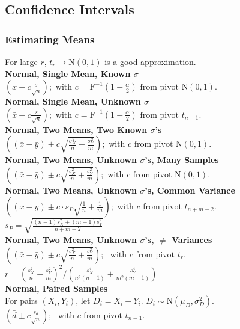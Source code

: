 \documentclass{article}
\begin{document}
\begin{multicols*}{2}
\subsection*{Confidence Intervals}
{\color{magenta}\subsubsection*{Estimating Means}}
{\color{blue}For large $r$, $t_{r} \longrightarrow \mbox{N}(0, 1)$ is a good approximation.}\\
\textbf{Normal, Single Mean, Known $\sigma$}\\
$ \left( \bar{x} \pm c \frac{\sigma}{\sqrt{n}} \right) ; \mbox{ with } c=\mbox{F}^{-1}(1-\frac{\alpha}{2}) \mbox{ from pivot } \mbox{N}(0, 1).$\\
\textbf{Normal, Single Mean, Unknown $\sigma$}\\
$ \left( \bar{x} \pm c \frac{s}{\sqrt{n}} \right); \mbox{ with } c=\mbox{F}^{-1}(1-\frac{\alpha}{2}) \mbox{ from pivot } t_{n-1}.$\\
\textbf{Normal, Two Means, Two Known $\sigma$'s}\\
$ \left( (\bar{x} - \bar{y}) \pm c \sqrt{\frac{\sigma_{X}^{2}}{n} + \frac{\sigma_{Y}^{2}}{m}} \right); \mbox{ with } c \mbox{ from pivot } \mbox{N}(0, 1).$\\
\textbf{Normal, Two Means, Unknown $\sigma$'s, Many Samples}\\
$ \left( (\bar{x} - \bar{y}) \pm c \sqrt{\frac{s_{X}^{2}}{n} + \frac{s_{Y}^{2}}{m}} \right); \mbox{ with } c \mbox{ from pivot } \mbox{N}(0, 1).$\\
\textbf{Normal, Two Means, Unknown $\sigma$'s, Common Variance}\\
$ \left( (\bar{x} - \bar{y}) \pm c \cdot s_{P} \sqrt{\frac{1}{n} + \frac{1}{m}} \right); \mbox{ with } c \mbox{ from pivot } t_{n+m-2}.$\\
\-\hspace{2cm} $ s_{P} = \sqrt{\frac{(n-1) s^{2}_{X} + (m-1) s^{2}_{Y}}{n+m-2}} $\\
\textbf{Normal, Two Means, Unknown $\sigma$'s, $\neq$ Variances}\\  %
$ \left( (\bar{x} - \bar{y}) \pm c \sqrt{\frac{s_{X}^{2}}{n} + \frac{s_{Y}^{2}}{m}} \right);$ {\color{blue}$\mbox{ with } c \mbox{ from pivot } t_{r}.$}\\
\-\hspace{1cm} $ r = \left( \frac{s_{X}^{2}}{n} + \frac{s_{Y}^{2}}{m} \right)^2 / \left( \frac{s_{X}^{4}}{n^{2}(n-1)} + \frac{s_{Y}^{4}}{m^{2}(m-1)} \right) $\\
\textbf{Normal, Paired Samples}\\
For pairs $(X_{i}, Y_{i})$, let $D_{i} = X_{i} - Y_{i}$. $D_{i} \sim \mbox{N}(\mu_{D}, \sigma_{D}^{2}).$\\
$ \left( \bar{d} \pm c \frac{s_{d}}{\sqrt{n}} \right);$ {\color{blue}$\mbox{ with } c \mbox{ from pivot } t_{n-1}.$}


\end{multicols*}
\end{document}
